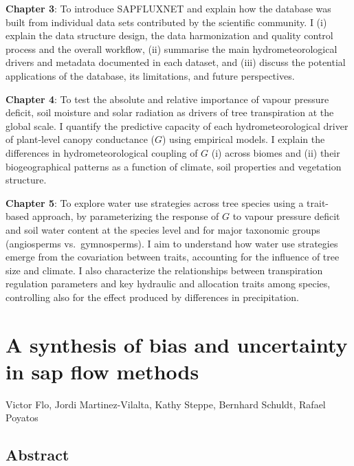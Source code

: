 \documentclass[11pt,twoside]{reedthesis}
\begin{document}
\textbf{Chapter 3}: To introduce SAPFLUXNET and explain how the database
was built from individual data sets contributed by the scientific
community. I (i) explain the data structure design, the data
harmonization and quality control process and the overall workflow, (ii)
summarise the main hydrometeorological drivers and metadata documented
in each dataset, and (iii) discuss the potential applications of the
database, its limitations, and future perspectives.\par

\textbf{Chapter 4}: To test the absolute and relative importance of
vapour pressure deficit, soil moisture and solar radiation as drivers of
tree transpiration at the global scale. I quantify the predictive
capacity of each hydrometeorological driver of plant-level canopy
conductance (\(G\)) using empirical models. I explain the differences in
hydrometeorological coupling of \(G\) (i) across biomes and (ii) their
biogeographical patterns as a function of climate, soil properties and
vegetation structure.\par

\textbf{Chapter 5}: To explore water use strategies across tree species
using a trait-based approach, by parameterizing the response of \(G\) to
vapour pressure deficit and soil water content at the species level and
for major taxonomic groups (angiosperms vs.~gymnosperms). I aim to
understand how water use strategies emerge from the covariation between
traits, accounting for the influence of tree size and climate. I also
characterize the relationships between transpiration regulation
parameters and key hydraulic and allocation traits among species,
controlling also for the effect produced by differences in
precipitation.\par

\chapter[Bias and uncertainty in sap flow methods]{A synthesis of bias and uncertainty in sap flow methods}

\setlength{\parindent}{0pt} Victor Flo, Jordi Martinez-Vilalta, Kathy
Steppe, Bernhard Schuldt, Rafael Poyatos \newpage
\setlength{\parindent}{30pt}

\section*{Abstract}
\end{document}
